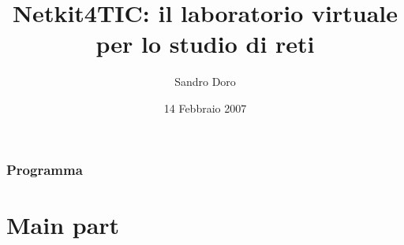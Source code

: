 \documentclass{beamer}
\title{Netkit4TIC: il laboratorio virtuale per lo studio di reti}
\author{Sandro Doro}
\institute[ITIS ``C.Zuccante'' - Venezia--Mestre]{
  ITIS ``C.Zuccante'' - Venezia--Mestre\\
  Corso Serale Sirio}
\date{14 Febbraio 2007}
\begin{document}
\frame{\titlepage
}

\section*{Programma}



\part{Main part}

\end{document}
